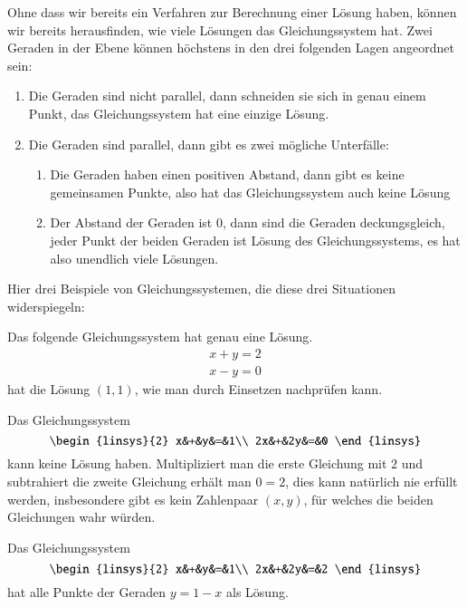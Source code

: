 Ohne dass wir bereits ein Verfahren zur Berechnung einer
Lösung haben, können wir bereits herausfinden, wie viele
Lösungen das Gleichungssystem hat.
Zwei Geraden in der Ebene
können höchstens in den drei folgenden Lagen angeordnet sein:
\begin{enumerate}
\item Die Geraden sind nicht parallel, dann schneiden sie sich in
genau einem Punkt, das Gleichungssystem hat eine einzige Lösung.
\item Die Geraden sind parallel, dann gibt es zwei mögliche Unterfälle:
\begin{enumerate}
\item Die Geraden haben einen positiven Abstand, dann gibt es keine
gemeinsamen Punkte, also hat das Gleichungssystem auch keine Lösung
\item Der Abstand der Geraden ist $0$, dann sind die Geraden deckungsgleich,
jeder Punkt der beiden Geraden ist Lösung des Gleichungssystems, es hat
also unendlich viele Lösungen.
\end{enumerate}
\end{enumerate}
Hier drei Beispiele von Gleichungssystemen, die diese drei Situationen
widerspiegeln:
\begin{beispiel}
Das folgende Gleichungssystem hat genau eine Lösung.
\begin{align*}
x+y=2\\
x-y=0
\end{align*}
hat die Lösung $(1,1)$, wie man durch Einsetzen nachprüfen kann.
\end{beispiel}
\begin{beispiel}
Das Gleichungssystem
\[
\begin{linsys}{2}
x&+&y&=&1\\
2x&+&2y&=&0
\end{linsys}
\]
kann keine Lösung haben.
Multipliziert man die erste Gleichung mit $2$
und subtrahiert die zweite Gleichung erhält man $0=2$, dies kann natürlich
nie erfüllt werden, insbesondere gibt es kein Zahlenpaar $(x,y)$, für
welches die beiden Gleichungen wahr würden.
\end{beispiel}
\begin{beispiel}
Das Gleichungssystem
\[
\begin{linsys}{2}
x&+&y&=&1\\
2x&+&2y&=&2
\end{linsys}
\]
hat alle Punkte der Geraden $y=1-x$ als Lösung.
\end{beispiel}

